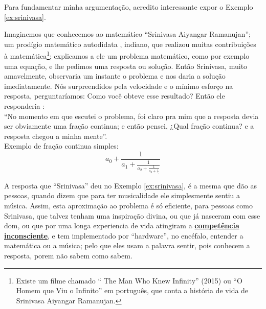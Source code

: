 Para fundamentar minha argumentação, acredito interessante expor o Exemplo \ref{ex:srinivasa}. 
\begin{example}
\label{ex:srinivasa}
Imaginemos que conhecemos ao matemático ``Srinivasa Aiyangar Ramanujan'';
um prodígio matemático autodidata \cite[pp. 1]{kanigel2016man}, indiano, que 
realizou muitas contribuições à matemática\footnote{Existe 
um filme chamado `` The Man Who Knew Infinity'' (2015) ou 
``O Homem que Viu o Infinito'' em português, que conta a história de vida de Srinivasa Aiyangar Ramanujan.};
explicamos a ele um problema  matemático, 
como por exemplo uma equação,
e  lhe pedimos uma resposta ou solução. 
Então Srinivasa, muito amavelmente, 
observaria um instante o problema e nos daria a solução imediatamente.
Nós surpreendidos pela velocidade e o mínimo esforço na resposta,
perguntaríamos: Como você obteve esse resultado? Então ele responderia \cite[pp. 235]{kanigel2016man}:\\

``No momento em que escutei o problema, 
foi claro pra mim que a resposta devia ser obviamente uma fração continua; 
e então pensei, ¿Qual fração continua? e a resposta chegou a minha mente''.\\

Exemplo de fração continua simples:
\begin{equation}
a_{0}+{\frac {1}{a_{1}+{\frac {1}{a_{2}+{\frac {1}{a_{3}+{\frac {1}{\ddots }}}}}}}}
\end{equation}
\end{example}

A resposta que ``Srinivasa'' deu no Exemplo  \ref{ex:srinivasa}, 
é a mesma  que dão as pessoas, quando  dizem que para ter musicalidade ele simplesmente sentiu a música. 
Assim, esta aproximação ao problema é só eficiente, para pessoas como Srinivasa, 
que talvez tenham uma inspiração divina, 
ou que já nasceram com esse dom, ou que por uma longa experiencia de vida atingiram 
a \hyperref[ref:CompetenciaInconsciente]{\textbf{competência inconsciente}}, 
e tem implementado por ``hardware'', no encéfalo, entender a matemática ou a música; 
pelo que eles usam a palavra sentir, 
pois conhecem a resposta, porem não sabem como sabem. 

